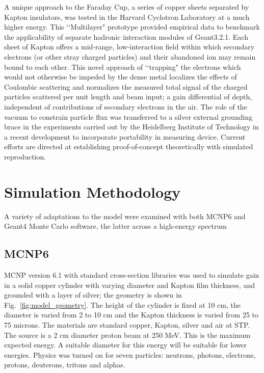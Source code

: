 \documentclass{mc2015}
\begin{document}
A unique approach to the Faraday Cup, a series of copper sheets separated by Kapton insulators, was tested in the Harvard Cyclotron Laboratory at a much higher energy.  This \lq\lq Multilayer" prototype provided empirical data to benchmark the applicability of separate hadronic interaction modules of Geant3.2.1. Each sheet of Kapton offers a mid-range, low-interaction field within which secondary electrons (or other stray charged particles) and their abandoned ion may remain bound to each other\cite{go99}.  This novel approach of \lq\lq trapping" the electrons which would not otherwise be impeded by the dense metal localizes the effects of Coulombic scattering and normalizes the measured total signal of the charged particles scattered per unit length and beam input; a gain differential of depth, independent of contributions of secondary electrons in the air.  The role of the vacuum to constrain particle flux was transferred to a silver external grounding brace in the experiments carried out by the Heidelberg Institute of Technology in a recent development to incorporate portability in measuring device.  Current efforts are directed at establishing proof-of-concept theoretically with simulated reproduction.

\section{Simulation Methodology}

A variety of adaptations to the model were examined with both MCNP6 and Geant4 Monte Carlo software, the latter across a high-energy spectrum 

\subsection{MCNP6}

MCNP version 6.1 with standard cross-section libraries was used to simulate gain in a solid copper cylinder with varying diameter and Kapton film thickness, and grounded with a layer of silver; the geometry is shown in Fig.~\ref{fig:model_geometry}. The height of the cylinder is fixed at 10 cm, the diameter is varied from 2 to 10 cm and the Kapton thickness is varied from 25 to 75 microns. The materials are standard copper, Kapton, silver and air at STP. The source is a 2 cm diameter proton beam at 250 MeV. This is the maximum expected energy. A suitable diameter for this energy will be suitable for lower energies. Physics was turned on for seven particles: neutrons, photons, electrons, protons, deuterons, tritons and alphas.
\end{document}
